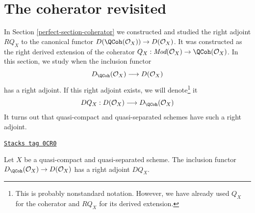 \section{The coherator revisited}
\label{perfect-section-better-coherator}
In Section \ref{perfect-section-coherator} we constructed and studied
the right adjoint $RQ_X$ to the canonical functor
$D(\QCoh(\mathcal{O}_X)) \to D(\mathcal{O}_X)$.
It was constructed as the right derived extension of the coherator
$Q_X : \textit{Mod}(\mathcal{O}_X) \to \QCoh(\mathcal{O}_X)$.
In this section, we study when the inclusion functor
$$
D_\QCoh(\mathcal{O}_X) \longrightarrow D(\mathcal{O}_X)
$$
has a right adjoint. If this right adjoint exists, we will
denote\footnote{This is probably nonstandard notation. However, we have already
used $Q_X$ for the coherator and $RQ_X$ for its derived extension.} it
$$
DQ_X :
D(\mathcal{O}_X) \longrightarrow D_\QCoh(\mathcal{O}_X)
$$
It turns out that quasi-compact and quasi-separated
schemes have such a right adjoint.

\begin{lemma}
\label{perfect-lemma-better-coherator}
\href{https://stacks.math.columbia.edu/tag/0CR0}{\texttt{Stacks tag 0CR0}}

Let $X$ be a quasi-compact and quasi-separated scheme.
The inclusion functor $D_\QCoh(\mathcal{O}_X) \to D(\mathcal{O}_X)$
has a right adjoint $DQ_X$.
\end{lemma}

